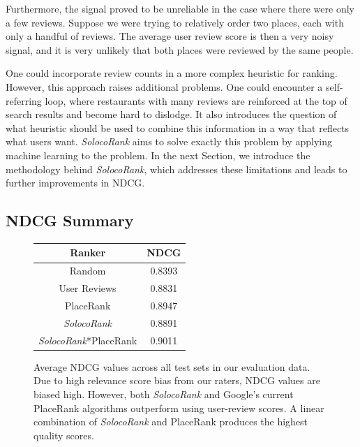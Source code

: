 Furthermore, the signal proved to be unreliable in the case where
there were only a few reviews. 
Suppose we were trying to relatively order two places, 
each with only a handful of reviews.
The average user review score is then a very noisy signal,
and it is very unlikely that both places were reviewed by the same people.

One could incorporate review counts in a more complex heuristic
for ranking.
However, this approach raises additional problems.
One could encounter a self-referring loop, where restaurants with many reviews
are reinforced at the top of search results and become hard to dislodge.
It also introduces the question of what heuristic should be used to 
combine this information in a way that reflects what users want.
\emph{SolocoRank} aims to solve exactly this problem by applying machine learning
to the problem.
In the next Section, we introduce the methodology behind \emph{SolocoRank},
which addresses these limitations and leads to further improvements in NDCG.

\subsection{NDCG Summary}
\begin{figure}
  \begin{center}
  \begin{tabular}{|c|c|}
    \hline
    Ranker            & NDCG  \\ \hline \hline
    Random            & 0.8393\\ \hline
    User Reviews      & 0.8831\\ \hline
    PlaceRank         & 0.8947\\ \hline
    \emph{SolocoRank}        & 0.8891\\ \hline
    \emph{SolocoRank}*PlaceRank  & 0.9011\\ \hline
  \end{tabular}
  \end{center}
  \caption{Average NDCG values across all test sets in our evaluation data.
  Due to high relevance score bias from our raters, NDCG values are biased high.
  However, both \emph{SolocoRank} and Google's current PlaceRank algorithms outperform
  using user-review scores. A linear combination of \emph{SolocoRank} and PlaceRank
  produces the highest quality scores.}
  \label{fig:ndcgtable}
\end{figure}

